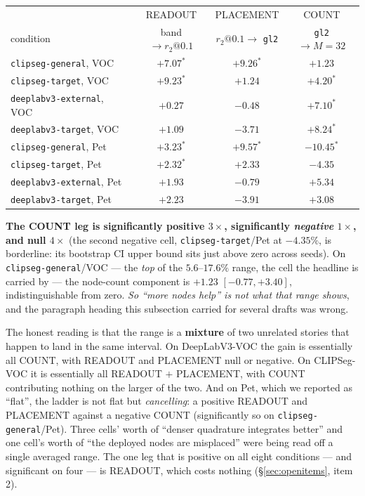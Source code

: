 \documentclass[11pt]{article}
\theoremstyle{remark}
\begin{document}
\begin{center}
\small
\begin{tabular}{lccc}
\toprule
 & READOUT & PLACEMENT & COUNT \\
condition & band $\to r_2@0.1$ & $r_2@0.1 \to$ \texttt{gl2} & \texttt{gl2} $\to M{=}32$ \\
\midrule
\texttt{clipseg-general}, VOC    & $+7.07^*$ & $\mathbf{+9.26^*}$ & $+1.23$ \\
\texttt{clipseg-target}, VOC     & $+9.23^*$ & $+1.24$ & $+4.20^*$ \\
\texttt{deeplabv3-external}, VOC & $+0.27$ & $-0.48$ & $\mathbf{+7.10^*}$ \\
\texttt{deeplabv3-target}, VOC   & $+1.09$ & $-3.71$ & $\mathbf{+8.24^*}$ \\
\midrule
\texttt{clipseg-general}, Pet    & $+3.23^*$ & $+9.57^*$ & $\mathbf{-10.45^*}$ \\
\texttt{clipseg-target}, Pet     & $+2.32^*$ & $+2.33$ & $\mathbf{-4.35}$ \\
\texttt{deeplabv3-external}, Pet & $+1.93$ & $-0.79$ & $+5.34$ \\
\texttt{deeplabv3-target}, Pet   & $+2.23$ & $-3.91$ & $+3.08$ \\
\bottomrule
\end{tabular}
\end{center}

\textbf{The COUNT leg is significantly positive $3\times$, significantly \emph{negative}
$1\times$, and null $4\times$} (the second negative cell, \texttt{clipseg-target}/Pet at
$-4.35\%$, is borderline: its bootstrap CI upper bound sits just above zero across seeds).
On \texttt{clipseg-general}/VOC --- the \emph{top} of the
$5.6$--$17.6\%$ range, the cell the headline is carried by --- the node-count component
is $+1.23$ $[-0.77, +3.40]$, indistinguishable from zero. \emph{So ``more nodes help'' is
not what that range shows}, and the paragraph heading this subsection carried for several
drafts was wrong.

The honest reading is that the range is a \textbf{mixture} of two unrelated stories that
happen to land in the same interval. On DeepLabV3-VOC the gain is essentially all COUNT,
with READOUT and PLACEMENT null or negative. On CLIPSeg-VOC it is essentially all READOUT
$+$ PLACEMENT, with COUNT contributing nothing on the larger of the two. And on Pet,
which we reported as ``flat'', the ladder is not flat but \emph{cancelling}: a positive
READOUT and PLACEMENT against a negative COUNT (significantly so on
\texttt{clipseg-general}/Pet). Three cells' worth of
``denser quadrature integrates better'' and one cell's worth of ``the deployed nodes are
misplaced'' were being read off a single averaged range. The one leg that is positive on
all eight conditions --- and significant on four --- is READOUT, which costs nothing
(\S\ref{sec:openitems}, item 2).
\end{document}
